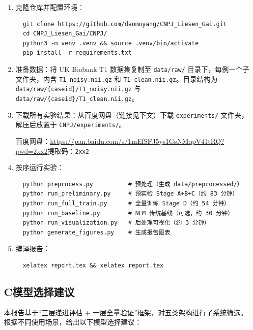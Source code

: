 \documentclass[UTF8,a4paper,12pt]{ctexart}
\begin{document}
\begin{enumerate}
  \item 克隆仓库并配置环境：
  \begin{verbatim}
  git clone https://github.com/daomuyang/CNPJ_Liesen_Gai.git
  cd CNPJ_Liesen_Gai/CNPJ/
  python3 -m venv .venv && source .venv/bin/activate
  pip install -r requirements.txt
  \end{verbatim}

  \item 准备数据：将 UK Biobank T1 数据集复制至 \texttt{data/raw/} 目录下，每例一个子文件夹，内含 \texttt{T1\_noisy.nii.gz} 和 \texttt{T1\_clean.nii.gz}。目录结构为\\ \texttt{data/raw/\{caseid\}/T1\_noisy.nii.gz} 与 \texttt{data/raw/\{caseid\}/T1\_clean.nii.gz}。

  \item 下载所有实验结果：从百度网盘（链接见下文）下载 \texttt{experiments/} 文件夹，解压后放置于 \texttt{CNPJ/experiments/}。
  
  {\small\raggedright 百度网盘：\url{https://pan.baidu.com/s/1mEfSFJ5ys1GsNMqpV41tRQ?pwd=2xx2}\quad 提取码：\texttt{2xx2}\par}

  \item 按序运行实验：
  \begin{verbatim}
  python preprocess.py          # 预处理（生成 data/preprocessed/）
  python run_preliminary.py     # 预实验 Stage A+B+C（约 83 分钟）
  python run_full_train.py      # 全量训练 Stage D（约 54 分钟）
  python run_baseline.py        # NLM 传统基线（可选，约 30 分钟）
  python run_visualization.py   # 后处理可视化（约 3 分钟）
  python generate_figures.py    # 生成报告图表
  \end{verbatim}

  \item 编译报告：
  \begin{verbatim}
  xelatex report.tex && xelatex report.tex
  \end{verbatim}
\end{enumerate}

\subsection*{C\quad 模型选择建议}

本报告基于“三层递进评估 $+$ 一层全量验证”框架，对五类架构进行了系统筛选。根据不同使用场景，给出以下模型选择建议：
\end{document}
